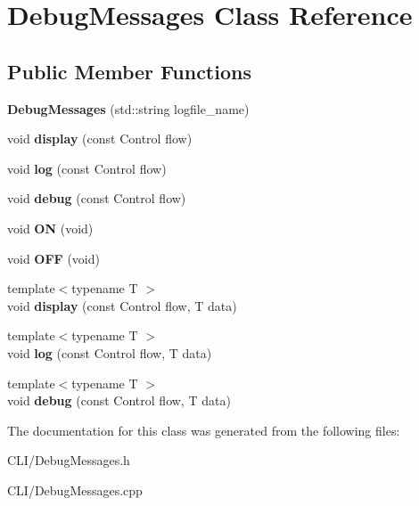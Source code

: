 \hypertarget{classDebugMessages}{}\section{Debug\+Messages Class Reference}
\label{classDebugMessages}
\subsection*{Public Member Functions}
\begin{DoxyCompactItemize}
\item 
\mbox{\label{classDebugMessages_aa60430ca0e05e43a8bb27f4cdc1a158c}} 
{\bfseries Debug\+Messages} (std\+::string logfile\+\_\+name)
\item 
\mbox{\label{classDebugMessages_a9a73bcf5d8298fd68b55a28c0878e852}} 
void {\bfseries display} (const Control flow)
\item 
\mbox{\label{classDebugMessages_a802f7d26dedc412f06bfe0957415bfd4}} 
void {\bfseries log} (const Control flow)
\item 
\mbox{\label{classDebugMessages_a5cd8aa8eb917f7da19484adc2c7e31a2}} 
void {\bfseries debug} (const Control flow)
\item 
\mbox{\label{classDebugMessages_a95866775dcf301773daa7bed529c557e}} 
void {\bfseries ON} (void)
\item 
\mbox{\label{classDebugMessages_ac1e4085ade0d1ff7b603fd8205f74b7c}} 
void {\bfseries O\+FF} (void)
\item 
\mbox{\label{classDebugMessages_ae9e335acbae42f1c8c97e03d4d588a8f}} 
{\footnotesize template$<$typename T $>$ }\\void {\bfseries display} (const Control flow, T data)
\item 
\mbox{\label{classDebugMessages_accb5bd318d0b085aa1824ddd7b1bd31e}} 
{\footnotesize template$<$typename T $>$ }\\void {\bfseries log} (const Control flow, T data)
\item 
\mbox{\label{classDebugMessages_a49564f4a501f15317f26c360d0bfdb90}} 
{\footnotesize template$<$typename T $>$ }\\void {\bfseries debug} (const Control flow, T data)
\end{DoxyCompactItemize}


The documentation for this class was generated from the following files\+:\begin{DoxyCompactItemize}
\item 
C\+L\+I/Debug\+Messages.\+h\item 
C\+L\+I/Debug\+Messages.\+cpp\end{DoxyCompactItemize}
